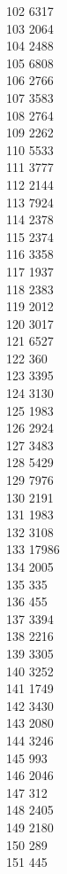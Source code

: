 { 102	6317 \\
 103	2064 \\
 104	2488 \\
 105	6808 \\
 106	2766 \\
 107	3583 \\
 108	2764 \\
 109	2262 \\
 110	5533 \\
 111	3777 \\
 112	2144 \\
 113	7924 \\
 114	2378 \\
 115	2374 \\
 116	3358 \\
 117	1937 \\
 118	2383 \\
 119	2012 \\
 120	3017 \\
 121	6527 \\
 122	360 \\
 123	3395 \\
 124	3130 \\
 125	1983 \\
 126	2924 \\
 127	3483 \\
 128	5429 \\
 129	7976 \\
 130	2191 \\
 131	1983 \\
 132	3108 \\
 133	17986 \\
 134	2005 \\
 135	335 \\
 136	455 \\
 137	3394 \\
 138	2216 \\
 139	3305 \\
 140	3252 \\
 141	1749 \\
 142	3430 \\
 143	2080 \\
 144	3246 \\
 145	993 \\
 146	2046 \\
 147	312 \\
 148	2405 \\
 149	2180 \\
 150	289 \\
 151	445 \\
}
